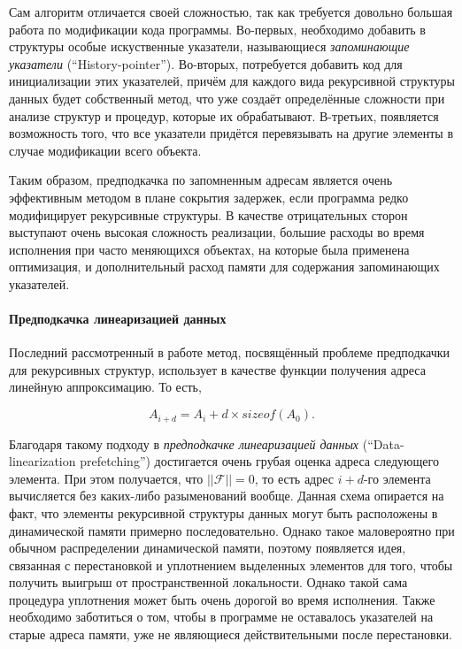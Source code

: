 \documentclass[12pt,a4paper]{article}
\begin{document}
Сам алгоритм отличается своей сложностью, так как требуется довольно большая работа по модификации кода программы. Во-первых, необходимо добавить в структуры особые искуственные указатели, называющиеся \emph{запоминающие указатели} (``History-pointer''). Во-вторых, потребуется добавить код для инициализации этих указателей, причём для каждого вида рекурсивной структуры данных будет собственный метод, что уже создаёт определённые сложности при анализе структур и процедур, которые их обрабатывают. В-третьих, появляется возможность того, что все указатели придётся перевязывать на другие элементы в случае модификации всего объекта.

Таким образом, предподкачка по запомненным адресам является очень эффективным методом в плане сокрытия задержек, если программа редко модифицирует рекурсивные структуры. В качестве отрицательных сторон выступают очень высокая сложность реализации, большие расходы во время исполнения при часто меняющихся объектах, на которые была применена оптимизация, и дополнительный расход памяти для содержания запоминающих указателей.

\paragraph{Предподкачка линеаризацией данных}

Последний рассмотренный в работе метод, посвящённый проблеме предподкачки для рекурсивных структур, использует в качестве функции получения адреса линейную аппроксимацию. То есть,

\begin{displaymath}
  A_{i+d} = A_i + d \times sizeof(A_0).
\end{displaymath}

Благодаря такому подходу в \emph{предподкачке линеаризацией данных} (``Data-linearization prefetching'') достигается очень грубая оценка адреса следующего элемента. При этом получается, что $||\mathcal{F}|| = 0$, то есть адрес $i+d$-го элемента вычисляется без каких-либо разыменований вообще. Данная схема опирается на факт, что элементы рекурсивной структуры данных могут быть расположены в динамической памяти примерно последовательно. Однако такое маловероятно при обычном распределении динамической памяти, поэтому появляется идея, связанная с перестановкой и уплотнением выделенных элементов для того, чтобы получить выигрыш от пространственной локальности. Однако такой сама процедура уплотнения может быть очень дорогой во время исполнения. Также необходимо заботиться о том, чтобы в программе не оставалось указателей на старые адреса памяти, уже не являющиеся действительными после перестановки.
\end{document}
